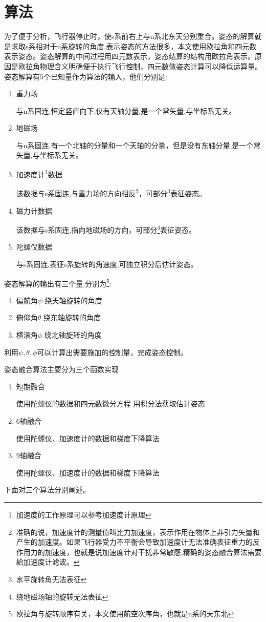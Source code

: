 \documentclass[12pt,a4paper]{article}
\begin{document}
\section{算法}
为了便于分析，飞行器停止时，使s系前右上与n系北东天分别重合。姿态的解算就是求取s系相对于n系旋转的角度,表示姿态的方法很多，本文使用欧拉角和四元数表示姿态。姿态解算的中间过程用四元数表示，姿态结算的结构用欧拉角表示。原因是欧拉角物理含义明确便于执行飞行控制，四元数做姿态计算可以降低运算量。
姿态解算有5个已知量作为算法的输入，他们分别是:
\begin{enumerate}
    \item 重力场

        与n系固连,恒定竖直向下,仅有天轴分量,是一个常矢量,与坐标系无关。
    \item 地磁场

        与n系固连,有一个北轴的分量和一个天轴的分量，但是没有东轴分量,是一个常矢量,与坐标系无关。
    \item 加速度计\footnote{加速度的工作原理可以参考加速度计原理\cite{加速度计原理}}数据

        该数据与s系固连,与重力场的方向相反\footnote{准确的说，加速度计的测量值叫比力加速度，表示作用在物体上非引力矢量和产生的加速度。如果飞行器受力不平衡会导致加速度计无法准确表征重力的反作用力的加速度，也就是说加速度计对干扰非常敏感,精确的姿态融合算法需要給加速度计滤波。}，可部分\footnote{水平旋转角无法表征}表征姿态。
    \item 磁力计数据

        该数据与s系固连,指向地磁场的方向，可部分\footnote{绕地磁场轴的旋转无法表征}表征姿态。
    \item 陀螺仪数据

        与s系固连,表征s系旋转的角速度,可独立积分后估计姿态。
\end{enumerate}
姿态解算的输出有三个量,分别为\footnote{欧拉角与旋转顺序有关，本文使用航空次序角，也就是n系的天东北}:
\begin{enumerate}
    \item 偏航角$\psi$
        绕天轴旋转的角度
    \item 俯仰角$\theta$
        绕东轴旋转的角度
    \item 横滚角$\phi$
        绕北轴旋转的角度
\end{enumerate}
利用$\psi,\theta,\phi$可以计算出需要施加的控制量，完成姿态控制。

姿态融合算法主要分为三个函数实现
\begin{enumerate}
    \item 短期融合

        使用陀螺仪的数据和四元数微分方程 用积分法获取估计姿态
    \item 6轴融合

        使用陀螺仪、加速度计的数据和梯度下降算法
    \item 9轴融合

        使用陀螺仪、加速度计的数据和梯度下降算法
\end{enumerate}
下面对三个算法分别阐述。
\end{document}
